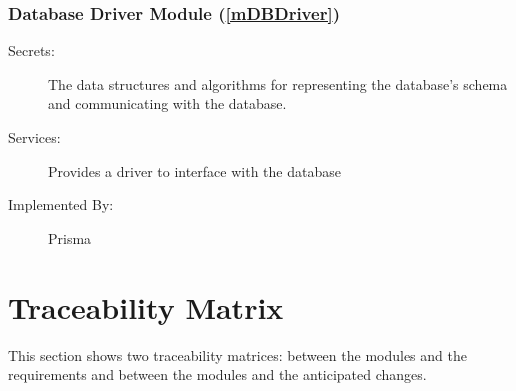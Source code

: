 \documentclass[12pt, titlepage]{article}
\begin{document}
\subsubsection{Database Driver Module (\ref{mDBDriver})}
\begin{description}
	\item[Secrets:] The data structures and algorithms for representing the database's schema and
		communicating with the database.
	\item[Services:] Provides a driver to interface with the database
	\item[Implemented By:] Prisma
\end{description}

\newpage

\section{Traceability Matrix} \label{SecTM}

This section shows two traceability matrices: between the modules and the requirements and between
the modules and the anticipated changes.
\end{document}

